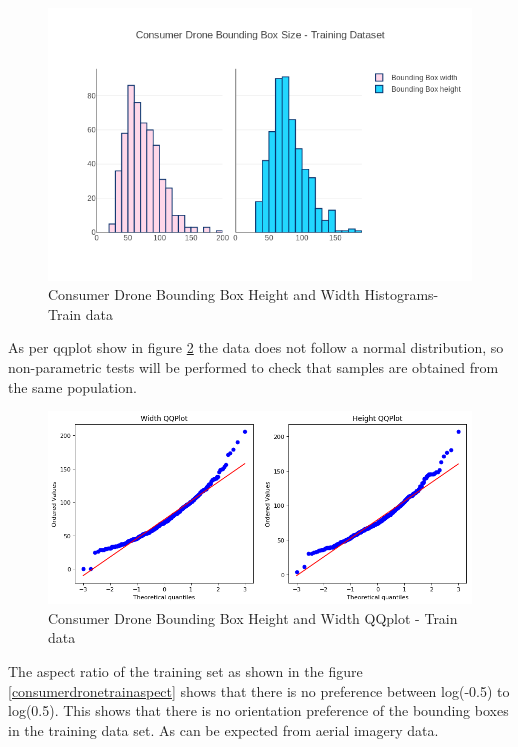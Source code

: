 \documentclass{IEEEtran}
\begin{document}
\begin{figure}[h]
\centering
\label{consumerdronetrainhist}
\includegraphics[scale=0.4]{images/train-histogram.png}
\caption{Consumer Drone Bounding Box Height and Width Histograms- Train data}
\end{figure}

As per qqplot show in figure \ref{consumerdronetrainqqplot} the data does not follow a normal distribution, so non-parametric tests will be performed to check that samples are obtained from the same population. 

\begin{figure}[h]
\centering
\label{consumerdronetrainqqplot}
\includegraphics[scale=0.4]{images/train-qqplot.png}
\caption{Consumer Drone Bounding Box Height and Width QQplot - Train data}
\end{figure}

The aspect ratio of the training set as shown in the figure \ref{consumerdronetrainaspect} shows that there is no preference between log(-0.5) to log(0.5). This shows that there is no orientation preference of the bounding boxes in the training data set. As can be expected from aerial imagery data.
\end{document}
